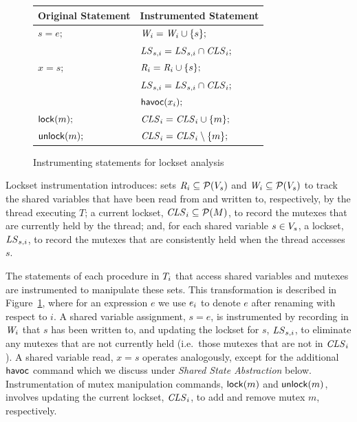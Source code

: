 \begin{figure}
\begin{tabular}{ll}
\textbf{Original Statement} & \textbf{Instrumented Statement} \\
\toprule

$s = e;$ & $\mathit{W}_{i} = \mathit{W}_{i} \cup \{ s \};$ \\
         & $\mathit{LS}_{s,i} = \mathit{LS}_{s,i} \cap \mathit{CLS}_{i};$ \\
\midrule
         
$x = s;$ & $\mathit{R}_{i} = \mathit{R}_{i} \cup \{ s \};$ \\
         & $\mathit{LS}_{s,i} = \mathit{LS}_{s,i} \cap \mathit{CLS}_{i};$ \\
         & $\mathsf{havoc}({x_{i}});$ \\
\midrule
         
$\mathsf{lock}(m);$   & $\mathit{CLS}_{i} = \mathit{CLS}_{i} \cup \{ m \};$ \\
\midrule

$\mathsf{unlock}(m);$ & $\mathit{CLS}_{i} = \mathit{CLS}_{i} \setminus \{ m \};$ \\
\bottomrule
\end{tabular}
\caption{Instrumenting statements for lockset analysis}
\label{fig:instrumentation}
\end{figure}

Lockset instrumentation introduces: sets $\mathit{R}_{i} \subseteq \mathcal{P}(V_s)$ and $\mathit{W}_{i} \subseteq \mathcal{P}(V_s)$ to track the shared variables that have been read from and written to, respectively, by the thread executing $T$; a current lockset, $\mathit{CLS}_{i} \subseteq \mathcal{P}(M)$, to record the mutexes that are currently held by the thread; and, for each shared variable $s \in V_s$, a lockset, $\mathit{LS}_{s,i}$, to record the mutexes that are consistently held when the thread accesses $s$.

The statements of each procedure in $T_{i}$ that access shared variables and mutexes are instrumented to manipulate these sets.  This transformation is described in Figure~\ref{fig:instrumentation}, where for an expression $e$ we use $e_{i}$ to denote $e$ after renaming with respect to $i$.  A shared variable assignment, $s = e$, is instrumented by recording in $\mathit{W}_{i}$ that $s$ has been written to, and updating the lockset for $s$, $\mathit{LS}_{s,i}$, to eliminate any mutexes that are not currently held (i.e.\ those mutexes that are not in $\mathit{CLS}_{i}$).  A shared variable read, $x = s$ operates analogously, except for the additional $\mathsf{havoc}$ command which we discuss under \emph{Shared State Abstraction} below.  Instrumentation of mutex manipulation commands, $\mathsf{lock}(m)$ and $\mathsf{unlock}(m)$, involves updating the current lockset, $\mathit{CLS}_{i}$, to add and remove mutex $m$, respectively.

